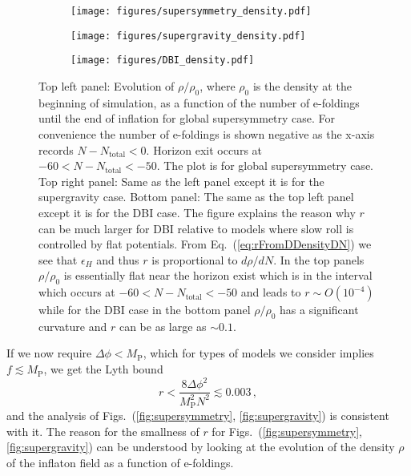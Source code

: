\documentclass[11pt]{article}
\begin{document}
\begin{figure}
  \centering
  \begin{subfigure}{0.45 \textwidth}
    \texttt{[image: figures/supersymmetry\_density.pdf]}
  \end{subfigure}
  \begin{subfigure}{0.45 \textwidth}
    \texttt{[image: figures/supergravity\_density.pdf]}
  \end{subfigure}
  \begin{subfigure}{0.45 \textwidth}
    \texttt{[image: figures/DBI\_density.pdf]}
  \end{subfigure}
  \caption{
    Top left panel: Evolution of $\rho / \rho_0$, where $\rho_0$ is the density at the beginning of simulation, as a function of the number of e-foldings until the end of inflation for global supersymmetry case.
    For convenience the number of e-foldings is shown negative as the x-axis records $N - N_\text{total} < 0$.
    Horizon exit occurs at $-60 < N - N_\text{total} < -50$.
    The plot is for global supersymmetry case.
    Top right panel: Same as the left panel except it is for the supergravity case.
    Bottom panel: The same as the top left panel except it is for the DBI case.
    The figure explains the reason why $r$ can be much larger for DBI relative to models where slow roll is controlled by flat potentials.
    From Eq.~(\ref{eq:rFromDDensityDN}) we see that $\epsilon_H$ and thus $r$ is proportional to $d\rho / dN$.
    In the top panels $\rho / \rho_0$ is essentially flat near the horizon exist which is in the interval which occurs at $-60 < N - N_\text{total} < -50$ and leads to $r \sim O\left(10^{-4}\right)$ while for the DBI case in the bottom panel $\rho / \rho_0$ has a significant curvature and $r$ can be as large as $\sim 0.1$.
  } \label{fig:density}
\end{figure}
If we now require $\Delta \phi < M_\text{P}$, which for types of models we consider implies $f \lesssim M_\text{P}$, we get the Lyth bound~\cite{Lyth:1996im}
\begin{equation} \label{eq:LythBound}
  r < \frac{8 \Delta \phi^2}{M_\text{P}^2 N^2} \lesssim 0.003\,,
\end{equation}
and the analysis of Figs.~(\ref{fig:supersymmetry}, \ref{fig:supergravity}) is consistent with it.
The reason for the smallness of $r$ for Figs.~(\ref{fig:supersymmetry}, \ref{fig:supergravity}) can be understood by looking at the evolution of the density $\rho$ of the inflaton field as a function of e-foldings.
\end{document}
